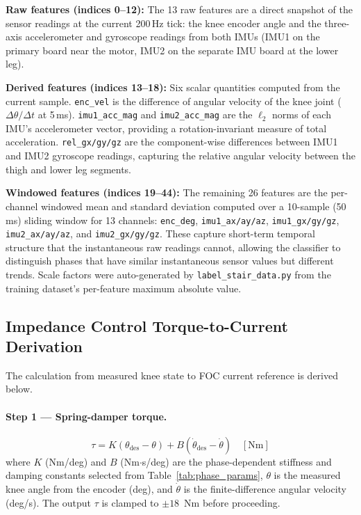 \documentclass[11pt]{article}
\begin{document}
\noindent\textbf{Raw features (indices 0--12):} The 13 raw features are a direct snapshot of the sensor readings at the current 200\,Hz tick: the knee encoder angle and the three-axis accelerometer and gyroscope readings from both IMUs (IMU1 on the primary board near the motor, IMU2 on the separate IMU board at the lower leg).

\noindent\textbf{Derived features (indices 13--18):} Six scalar quantities computed from the current sample. \texttt{enc\_vel} is the difference of angular velocity of the knee joint ($\Delta\theta / \Delta t$ at 5\,ms). \texttt{imu1\_acc\_mag} and \texttt{imu2\_acc\_mag} are the $\ell_2$ norms of each IMU's accelerometer vector, providing a rotation-invariant measure of total acceleration. \texttt{rel\_gx/gy/gz} are the component-wise differences between IMU1 and IMU2 gyroscope readings, capturing the relative angular velocity between the thigh and lower leg segments.

\noindent\textbf{Windowed features (indices 19--44):} The remaining 26 features are the per-channel windowed mean and standard deviation computed over a 10-sample (50\,ms) sliding window for 13 channels: \texttt{enc\_deg}, \texttt{imu1\_ax/ay/az}, \texttt{imu1\_gx/gy/gz}, \texttt{imu2\_ax/ay/az}, and \texttt{imu2\_gx/gy/gz}. These capture short-term temporal structure that the instantaneous raw readings cannot, allowing the classifier to distinguish phases that have similar instantaneous sensor values but different trends. Scale factors were auto-generated by \texttt{label\_stair\_data.py} from the training dataset's per-feature maximum absolute value.

\subsection{Impedance Control Torque-to-Current Derivation}

The calculation from measured knee state to FOC current reference is derived below.

\paragraph{Step 1 — Spring-damper torque.}
\begin{equation}
    \tau = K(\theta_\text{des} - \theta) + B(\dot{\theta}_\text{des} - \dot{\theta}) \quad [\text{Nm}]
\end{equation}
where $K$ (Nm/deg) and $B$ (Nm$\cdot$s/deg) are the phase-dependent stiffness and damping constants selected from Table~\ref{tab:phase_params}, $\theta$ is the measured knee angle from the encoder (deg), and $\dot{\theta}$ is the finite-difference angular velocity (deg/s). The output $\tau$ is clamped to $\pm18$~Nm before proceeding.
\end{document}
